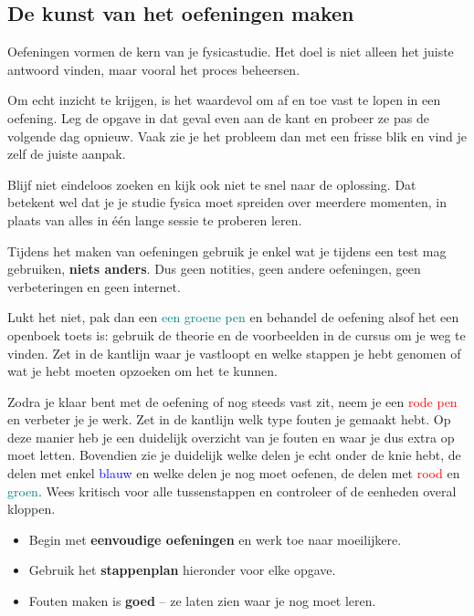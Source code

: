 \documentclass{ximera}
\begin{document}

\subsection{De kunst van het oefeningen maken}

Oefeningen vormen de kern van je fysicastudie.
Het doel is niet alleen het juiste antwoord vinden, maar vooral het proces beheersen.

Om echt inzicht te krijgen, is het waardevol om af en toe vast te lopen in een oefening.
Leg de opgave in dat geval even aan de kant en probeer ze pas de volgende dag opnieuw.
Vaak zie je het probleem dan met een frisse blik en vind je zelf de juiste aanpak.

Blijf niet eindeloos zoeken en kijk ook niet te snel naar de oplossing.
Dat betekent wel dat je je studie fysica moet spreiden over meerdere momenten,
in plaats van alles in één lange sessie te proberen leren.

Tijdens het maken van oefeningen gebruik je enkel wat je tijdens een test mag gebruiken, \textbf{niets anders}.
Dus geen notities, geen andere oefeningen, geen verbeteringen en geen internet.

Lukt het niet, pak dan een \textcolor{teal}{een groene pen} en behandel de oefening alsof het een openboek toets is: gebruik de theorie en de voorbeelden in de cursus om je weg te vinden.
Zet in de kantlijn waar je vastloopt en welke stappen je hebt genomen of wat je hebt moeten opzoeken om het te kunnen.

Zodra je klaar bent met de oefening of nog steeds vast zit, neem je een \textcolor{red}{rode pen} en verbeter je je werk. Zet in de kantlijn welk type fouten je gemaakt hebt.
Op deze manier heb je een duidelijk overzicht van je fouten en waar je dus extra op moet letten.
Bovendien zie je duidelijk welke delen je echt onder de knie hebt, de delen met enkel \textcolor{blue}{blauw} en welke delen je nog moet oefenen, de delen met \textcolor{red}{rood} en \textcolor{teal}{groen}.
Wees kritisch voor alle tussenstappen en controleer of de eenheden overal kloppen.



\begin{itemize}
    \item Begin met \textbf{eenvoudige oefeningen} en werk toe naar moeilijkere.
    \item Gebruik het \textbf{stappenplan} hieronder voor elke opgave.
    \item Fouten maken is \textbf{goed} – ze laten zien waar je nog moet leren.
\end{itemize}
\end{document}
